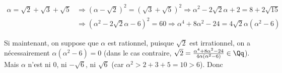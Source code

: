 {\begin{enumerate}
{\begin{align*}
\alpha=\sqrt{2}+\sqrt{3}+\sqrt{5}&\Rightarrow(\alpha-\sqrt{2})^2=(\sqrt{3}+\sqrt{5})^2 \Rightarrow\alpha^2-2\sqrt{2}\alpha+2=8+2\sqrt{15}\\
 &\Rightarrow(\alpha^2-2\sqrt{2}\alpha-6)^2=60\Rightarrow\alpha^4+8\alpha^2-24=4\sqrt{2}\alpha(\alpha^2-6)
\end{align*}
 

Si maintenant, on suppose que $\alpha$ est rationnel, puisque $\sqrt{2}$ est irrationnel, on a nécessairement $\alpha(\alpha^2-6)=0$ (dans le cas contraire, $\sqrt{2}=\frac{\alpha^4+8\alpha^2-24}{4\alpha(\alpha^2-6)}\in\Qq$). Mais $\alpha$ n'est ni $0$, ni $-\sqrt{6}$, ni $\sqrt{6}$ (car $\alpha^2>2+3+5=10>6$). Donc

\begin{center}
\end{center}}
\end{enumerate}
}
